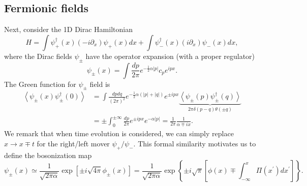 \documentclass{SciPost}
\begin{document}




\subsection{Fermionic fields}
Next, consider the 1D Dirac Hamiltonian 
\begin{equation}
	H = \int \psi_+^\dagger(x)(-i\partial_x)\psi_+(x) dx + \int \psi_-^\dagger(x)(i\partial_x)\psi_-(x) dx,
\end{equation}
where the Dirac fields $\psi_\pm$ have the operator expansion (with a proper regulator)
\begin{equation}
	\psi_\pm(x) = \int \frac{dp}{2\pi} e^{-\frac{1}{2}\alpha|p|}c_p e^{ipx}.
\end{equation}
The Green function for $\psi_\pm$ field is
\begin{equation*}
\begin{aligned}
	\left\langle\psi_{\pm}(x) \psi_{\pm}^{\dagger}(0)\right\rangle 
	&= \int \frac{d p dq}{(2 \pi)^2} e^{-\frac{1}{2} \alpha(|p|+|q|)} e^{\pm i p x} \underbrace{\left\langle\psi_{\pm}(p) \psi_{\pm}^{\dagger}(q)\right\rangle}_{2 \pi \delta(p-q) \theta(\pm q)} \\
	&= \pm\int_0^{\pm \infty} \frac{d p}{2 \pi} e^{\pm i p x} e^{-\alpha|p|}
	= \frac{1}{2\pi} \frac{1}{\alpha \mp ix}.
\end{aligned}
\end{equation*}
We remark that when time evolution is considered, we can simply replace $x \rightarrow x \mp t$ for the right/left mover $\psi_+/\psi_-$.
This formal similarity motivates us to define the bosonization map
\begin{equation}\label{eq:bosonization}
	\psi_\pm(x) \simeq \frac{1}{\sqrt{2\pi\alpha}} \exp\left[\pm i\sqrt{4\pi}\phi_\pm(x)\right]
	=\frac{1}{\sqrt{2 \pi \alpha}} \exp \left\{\pm i \sqrt{\pi}\left[\phi(x) \mp \int_{-\infty}^x \Pi\left(x^{\prime}\right) d x^{\prime}\right]\right\}.
\end{equation}
\end{document}
